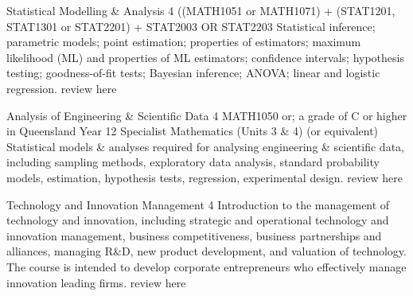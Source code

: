 	{Statistical Modelling \& Analysis}
	{4}
	{((MATH1051 or MATH1071) + (STAT1201, STAT1301 or STAT2201) + STAT2003 OR STAT2203}
	{}
	{}
	{Statistical inference; parametric models; point estimation; properties of estimators; maximum likelihood (ML) and properties of ML estimators; confidence intervals; hypothesis testing; goodness-of-fit tests; Bayesian inference; ANOVA; linear and logistic regression.}
	{review here}

	{Analysis of Engineering \& Scientific Data}
	{4}
	{MATH1050 or; a grade of C or higher in Queensland Year 12 Specialist Mathematics (Units 3 \& 4) (or equivalent)}
	{}
	{}
	{Statistical models \& analyses required for analysing engineering \& scientific data, including sampling methods, exploratory data analysis, standard probability models, estimation, hypothesis tests, regression, experimental design.}
	{review here}

	{Technology and Innovation Management}
	{4}
	{}
	{}
	{}
	{Introduction to the management of technology and innovation, including strategic and operational technology and innovation management, business competitiveness, business partnerships and alliances, managing R\&D, new product development, and valuation of technology. The course is intended to develop corporate entrepreneurs who effectively manage innovation leading firms.}
	{review here}
